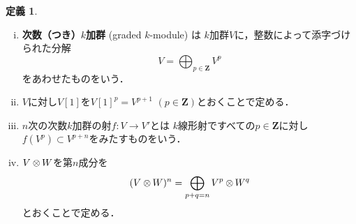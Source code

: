 \documentclass[leqno, 10pt, a4paper, dvipdfmx]{jsarticle}
\theoremstyle{definition}
\newcommand{\zz}{\mathbf{Z}}
\numberwithin{equation}{section}
\newcommand{\tens}[1][]{\mathbin{\otimes_{\raise1.5ex\hbox to-.1em{}{#1}}}}
\theoremstyle{mystyle}
\newtheorem{DFN}[AXM]{定義}
\begin{document}
\begin{DFN}
    \begin{enumerate}[(i)]
        \item \textbf{次数（つき）\(k\)加群} (graded \(k\)-module) は
        \(k\)加群\(V\)に，整数によって添字づけられた分解\[
            V=\bigoplus_{p\in\zz}V^{p}
        \]をあわせたものをいう．
        \item \(V\)に対し\(V[1]\)を\(
            V[1]^{p}=V^{p+1}
        \) \((p\in \zz)\)とおくことで定める．
        \item \(n\)次の次数\(k\)加群の射\(f\colon V\to V'\)とは
        \(k\)線形射ですべての\(p\in\zz\)に対し\(f(V^{p})\subset V^{p+n}\)をみたすものをいう．
        \item \(V\tens[]W\)を第\(n\)成分を\[
            (V\tens[]W)^{n}=\bigoplus_{p+q=n}V^p\tens[]W^q
        \]とおくことで定める．
    \end{enumerate}

\end{DFN}
\end{document}

